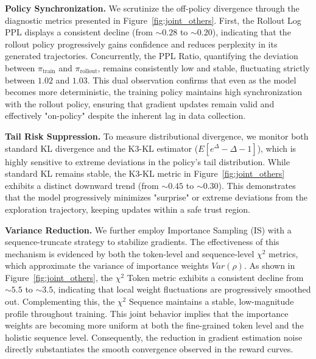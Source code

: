 \noindent\textbf{Policy Synchronization.}
We scrutinize the off-policy divergence through the diagnostic metrics presented in Figure~\ref{fig:joint_others}.
First, the Rollout Log PPL displays a consistent decline (from $\sim 0.28$ to $\sim 0.20$), indicating that the rollout policy progressively gains confidence and reduces perplexity in its generated trajectories.
Concurrently, the PPL Ratio, quantifying the deviation between $\pi_{\text{train}}$ and $\pi_{\text{rollout}}$, remains consistently low and stable, fluctuating strictly between $1.02$ and $1.03$.
This dual observation confirms that even as the model becomes more deterministic, the training policy maintains high synchronization with the rollout policy, ensuring that gradient updates remain valid and effectively "on-policy" despite the inherent lag in data collection.

\noindent\textbf{Tail Risk Suppression.}
To measure distributional divergence, we monitor both standard KL divergence and the K3-KL estimator ($E[e^{\Delta} - \Delta - 1]$), which is highly sensitive to extreme deviations in the policy's tail distribution. 
While standard KL remains stable, the K3-KL metric in Figure~\ref{fig:joint_others} exhibits a distinct downward trend (from $\sim 0.45$ to $\sim 0.30$). 
This demonstrates that the model progressively minimizes "surprise" or extreme deviations from the exploration trajectory, keeping updates within a safe trust region.

\noindent\textbf{Variance Reduction.}
We further employ Importance Sampling (IS) with a sequence-truncate strategy to stabilize gradients.
The effectiveness of this mechanism is evidenced by both the token-level and sequence-level $\chi^2$ metrics, which approximate the variance of importance weights $Var(\rho)$.
As shown in Figure~\ref{fig:joint_others}, the $\chi^2$ Token metric exhibits a consistent decline from $\sim 5.5$ to $\sim 3.5$, indicating that local weight fluctuations are progressively smoothed out.
Complementing this, the $\chi^2$ Sequence maintains a stable, low-magnitude profile throughout training.
This joint behavior implies that the importance weights are becoming more uniform at both the fine-grained token level and the holistic sequence level.
Consequently, the reduction in gradient estimation noise directly substantiates the smooth convergence observed in the reward curves.

